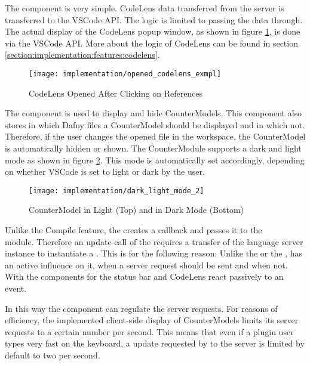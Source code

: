 The  component is very simple. CodeLens data transferred from the server is transferred to the VSCode API.
The logic is limited to passing the data through. The actual display of the CodeLens popup window,
as shown in figure \ref{fig:opened_codelens_exmpl},
is done via the VSCode API.
More about the logic of CodeLens can be found in section \ref{section:implementation:features:codelens}.

\begin{figure}[H]
    \centering
    \texttt{[image: implementation/opened\_codelens\_exmpl]}
    \caption{CodeLens Opened After Clicking on References}
    \label{fig:opened_codelens_exmpl}
\end{figure}

The  component is used to display and hide CounterModels.
This component also stores in which Dafny files a CounterModel should be displayed and in which not.
Therefore, if the user changes the opened file in the workspace, the CounterModel is automatically hidden or shown.
The CounterModule supports a dark and light mode as shown in figure \ref{fig:dark_light_mode_2}.
This mode is automatically set accordingly,
depending on whether VSCode is set to light or dark by the user.

\begin{figure}[H]
    \centering
    \texttt{[image: implementation/dark\_light\_mode\_2]}
    \caption{CounterModel in Light (Top) and in Dark Mode (Bottom)}
    \label{fig:dark_light_mode_2}
\end{figure}

Unlike the Compile feature, the  creates a callback and passes it to the \\
 module.
Therefore an update-call of the  requires a transfer of the language server instance to instantiate a .
This is for the following reason: Unlike the  or the ,
 has an active influence on it,
when a server request should be sent and when not.
With the components for the status bar and CodeLens react passively to an event.

In this way the  component can regulate the server requests.
For reasons of efficiency, the implemented client-side display of CounterModels limits its
server requests to a certain number per second.
This means that even if a plugin user types very fast on the keyboard, a
update requested by  to the server is limited by default to two per second. \\

